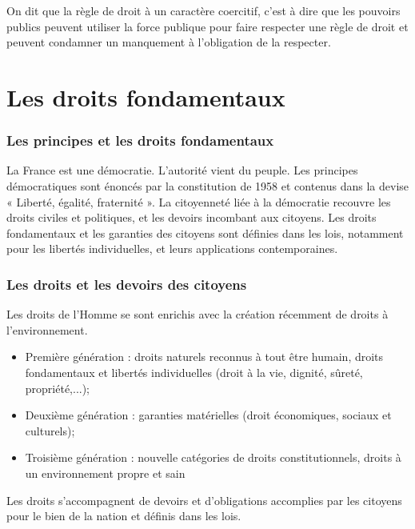 \documentclass[11pt]{article}
\begin{document}
			On dit que la règle de droit à un caractère coercitif, c'est à dire que les pouvoirs publics peuvent utiliser la force publique pour faire respecter une règle de droit et peuvent condamner un manquement à l'obligation de la respecter.

\newpage
\part{Les droits fondamentaux}
	\section{Les principes et les droits fondamentaux}
		La France est une démocratie. L'autorité vient du peuple. Les principes démocratiques sont énoncés par la constitution de 1958 et contenus dans la devise « Liberté, égalité, fraternité ». La citoyenneté liée à la démocratie recouvre les droits civiles et politiques, et les devoirs incombant aux citoyens. Les droits fondamentaux et les garanties des citoyens sont définies dans les lois, notamment pour les libertés individuelles, et leurs applications contemporaines.
		
	\section{Les droits et les devoirs des citoyens}
		Les droits de l'Homme se sont enrichis avec la création récemment de droits à l'environnement.
		\begin{itemize}
			\item Première génération : droits naturels reconnus à tout être humain, droits fondamentaux et libertés individuelles (droit à la vie, dignité, sûreté, propriété,...);
			\item Deuxième génération : garanties matérielles (droit économiques, sociaux et culturels);
			\item Troisième génération : nouvelle catégories de droits constitutionnels, droits à un environnement propre et sain
		\end{itemize}
		
		Les droits s'accompagnent de devoirs et d'obligations accomplies par les citoyens pour le bien de la nation et définis dans les lois.
		
		
\end{document}
